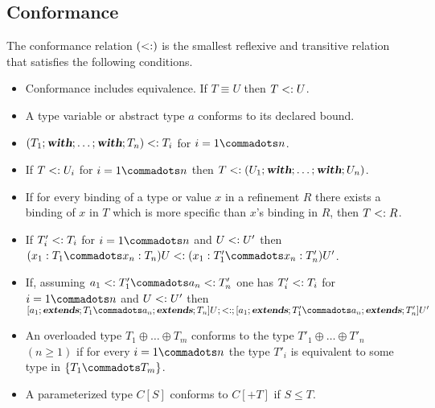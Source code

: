 \documentclass[11pt]{report}
\begin{document}
\subsection{Conformance}
\label{sec:subtyping}

The conformance relation $(<:)$ is the smallest reflexive and
transitive relation that satisfies the following conditions.
\begin{itemize}
\item Conformance includes equivalence. If $T \equiv U$ then $T <: U$.
\item A type variable or abstract type $a$ conforms to its declared bound.
\item $(T_1;\mbox{\sl\bfseries with};\ldots;\mbox{\sl\bfseries with};T_n) <: T_i$ for $i = 1 \commadots n$.
\item If $T <: U_i$ for $i = 1 \commadots n$ then
      $T <: (U_1;\mbox{\sl\bfseries with};\ldots;\mbox{\sl\bfseries with}; U_n)$.
\item If for every binding of a type or value $x$ in a refinement $R$
      there exists a binding of $x$ in $T$ which
      is more specific than $x$'s binding in $R$, then $T <: R$.
\item If
	$T'_i <: T_i$ for $i = 1 \commadots n$ and $U <: U'$ then
	$(x_1: T_1 \commadots x_n: T_n) U \conforms
	(x_1: T'_1 \commadots x_n: T'_n) U'$.
\item If, assuming $a_1 \conforms T'_1 \commadots a_n \conforms T'_n$ one has
	$T'_i <: T_i$ for $i = 1 \commadots n$ and $U <: U'$ then
$
[a_1 \extends T_1 \commadots a_n \extends T_n] U ;\conforms;
[a_1 \extends T'_1 \commadots a_n \extends T'_n] U'
$
\item An overloaded type $T_1 \oplus \ldots \oplus T_m$
      conforms to the type $T'_1 \oplus \ldots \oplus T'_n$ $(n \geq
      1)$ if for every $i = 1 \commadots n$ the type $T'_i$ is
      equivalent to some type in $\{T_1 \commadots T_m\}$.
\item A parameterized type $C[S]$ conforms to $C[+T]$ if $S \leq T$.
\end{itemize}
\end{document}

